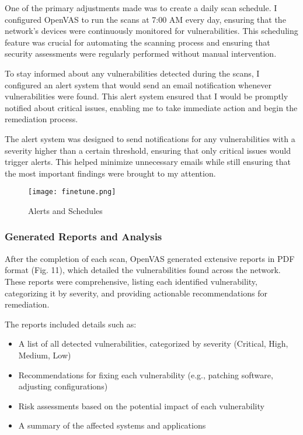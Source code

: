\documentclass[twocolumn]{article}
\begin{document}
One of the primary adjustments made was to create a daily scan schedule. I configured OpenVAS to run the scans at 7:00 AM every day, ensuring that the network's devices were continuously monitored for vulnerabilities. This scheduling feature was crucial for automating the scanning process and ensuring that security assessments were regularly performed without manual intervention.

To stay informed about any vulnerabilities detected during the scans, I configured an alert system that would send an email notification whenever vulnerabilities were found. This alert system ensured that I would be promptly notified about critical issues, enabling me to take immediate action and begin the remediation process.

The alert system was designed to send notifications for any vulnerabilities with a severity higher than a certain threshold, ensuring that only critical issues would trigger alerts. This helped minimize unnecessary emails while still ensuring that the most important findings were brought to my attention.

\begin{figure}[h!]
    \centering
    \texttt{[image: finetune.png]}
    \caption{Alerts and Schedules}
\end{figure}

\subsubsection{Generated Reports and Analysis}

After the completion of each scan, OpenVAS generated extensive reports in PDF format (Fig. 11), which detailed the vulnerabilities found across the network. These reports were comprehensive, listing each identified vulnerability, categorizing it by severity, and providing actionable recommendations for remediation.

The reports included details such as:

\begin{itemize}
    \item A list of all detected vulnerabilities, categorized by severity (Critical, High, Medium, Low)
    \item Recommendations for fixing each vulnerability (e.g., patching software, adjusting configurations)
    \item Risk assessments based on the potential impact of each vulnerability
    \item A summary of the affected systems and applications
\end{itemize}
\end{document}
